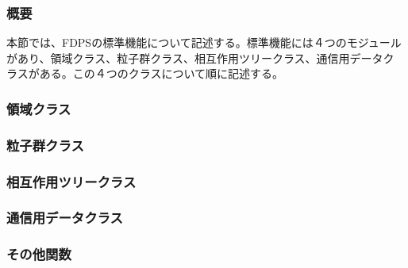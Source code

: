 \subsubsection{概要}

本節では、FDPSの標準機能について記述する。標準機能には４つのモジュール
があり、領域クラス、粒子群クラス、相互作用ツリークラス、通信用データク
ラスがある。この４つのクラスについて順に記述する。

\subsubsection{領域クラス}



\subsubsection{粒子群クラス}



\subsubsection{相互作用ツリークラス}



\subsubsection{通信用データクラス}



\subsubsection{その他関数}



